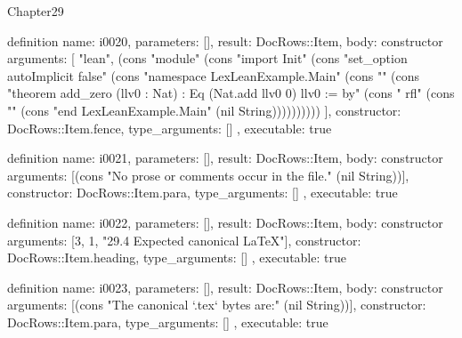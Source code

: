 \begin{lexlean}{Chapter29}
\begin{semanticmodule}
definition{
  name: i0020,
  parameters: [],
  result: DocRows::Item,
  body: constructor{
    arguments: [
      "lean",
      (cons "module" (cons "import Init" (cons "set_option autoImplicit false" (cons "namespace LexLeanExample.Main" (cons "" (cons "theorem add_zero (llv0 : Nat) : Eq (Nat.add llv0 0) llv0 := by" (cons "  rfl" (cons "" (cons "end LexLeanExample.Main" (nil String))))))))))
    ],
    constructor: DocRows::Item.fence,
    type_arguments: []
  },
  executable: true
}

definition{
  name: i0021,
  parameters: [],
  result: DocRows::Item,
  body: constructor{
    arguments: [(cons "No prose or comments occur in the file." (nil String))],
    constructor: DocRows::Item.para,
    type_arguments: []
  },
  executable: true
}

definition{
  name: i0022,
  parameters: [],
  result: DocRows::Item,
  body: constructor{
    arguments: [3, 1, "29.4 Expected canonical LaTeX"],
    constructor: DocRows::Item.heading,
    type_arguments: []
  },
  executable: true
}

definition{
  name: i0023,
  parameters: [],
  result: DocRows::Item,
  body: constructor{
    arguments: [(cons "The canonical `.tex` bytes are:" (nil String))],
    constructor: DocRows::Item.para,
    type_arguments: []
  },
  executable: true
}


\end{semanticmodule}
\end{lexlean}
